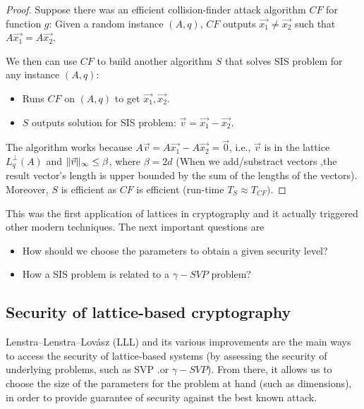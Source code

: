 \begin{proof}
  Suppose there was an efficient collision-finder attack algorithm $CF$ for
  function $g$: Given a random instance $(A,q)$, $CF$ outputs
  $\vec{x_1} \neq \vec{x_2}$ such that $A\vec{x_1} = A\vec{x_2}$.

  We then can use $CF$ to build another algorithm $S$ that solves SIS problem
  for any instance $(A,q)$:
  \begin{itemize}
  \item Runs $CF$ on $(A,q)$ to get $\vec{x_1},\vec{x_2}$.
  \item $S$ outputs solution for SIS problem: $\vec{v} = \vec{x_1} - \vec{x_2}$.
  \end{itemize}

  The algorithm works because $A\vec{v} = A\vec{x_1} - A\vec{x_2} = \vec{0}$,
  i.e., $\vec{v}$ is in the lattice $L_q^\bot(A)$ and
  $\Vert \vec{v} \Vert_{\infty} \leq \beta$, where $\beta = 2d$ (When we add/substract
  vectors ,the result vector's length is upper bounded by the sum of the lengths
  of the vectors). Moreover, $S$ is efficient as $CF$ is efficient (run-time
  $T_S \approx T_{CF})$.
\end{proof}
This was the first application of lattices in cryptography and it actually
triggered other modern techniques. The next important questions are
\begin{itemize}
\item How should we choose the parameters to obtain a given security level?
\item How a SIS problem is related to a $\gamma-SVP$ problem?
\end{itemize}

\subsection{Security of lattice-based cryptography}
\label{sec:latticeSecurity}
Lenstra–Lenstra–Lovász (LLL) and its various improvements are the main ways to
access the security of lattice-based systems (by assessing the security of
underlying problems, such as SVP .or $\gamma-SVP$). From there, it allows us to
choose the size of the parameters for the problem at hand (such as dimensions), in order
to provide guarantee of security against the best known attack.

